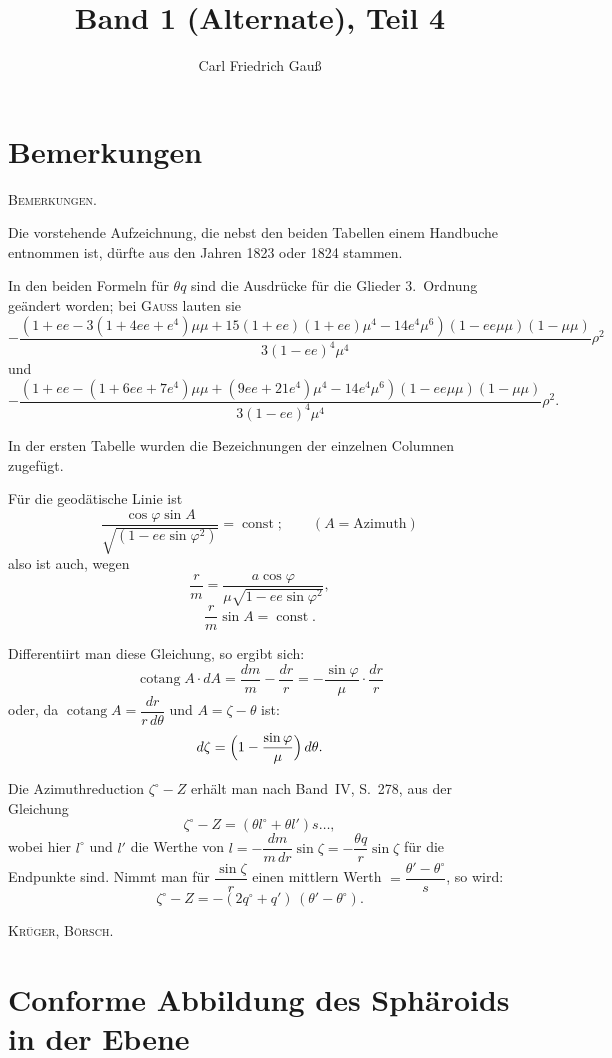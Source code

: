 \documentclass[12pt,a4paper]{article}
\title{Band 1 (Alternate), Teil 4}
\author{Carl Friedrich Gau\ss}
\date{}
\newcommand{\gaussname}{\textsc{Gau\ss}}
\newcommand{\cotang}{\operatorname{cotang}}
\DeclareMathOperator{\const}{const}
\begin{document}
\maketitle
\thispagestyle{empty}

\section*{Bemerkungen}

\begin{center}
\textsc{Bemerkungen.}
\end{center}

Die vorstehende Aufzeichnung, die nebst den beiden Tabellen einem Handbuche entnommen ist, dürfte aus den Jahren 1823 oder 1824 stammen.

In den beiden Formeln für $\theta q$ sind die Ausdrücke für die Glieder 3.~Ordnung geändert worden; bei \gaussname{} lauten sie
\[
-\frac{(1+ee-3(1+4ee+e^4)\mu\mu+15(1+ee)(1+ee)\mu^4-14e^4\mu^6)(1-ee\mu\mu)(1-\mu\mu)}{3(1-ee)^4\mu^4}\rho^2
\]
und
\[
-\frac{(1+ee-(1+6ee+7e^4)\mu\mu+(9ee+21e^4)\mu^4-14e^4\mu^6)(1-ee\mu\mu)(1-\mu\mu)}{3(1-ee)^4\mu^4}\rho^2.
\]

In der ersten Tabelle wurden die Bezeichnungen der einzelnen Columnen zugefügt.

Für die geodätische Linie ist
\[
\frac{\cos\varphi\sin A}{\sqrt{(1-ee\sin\varphi^2)}} = \const;\qquad (A = \text{Azimuth})
\]
also ist auch, wegen
\[
\frac{r}{m} = \frac{a\cos\varphi}{\mu\sqrt{1-ee\sin\varphi^2}},
\]
\[
\frac{r}{m}\sin A = \const.
\]

Differentiirt man diese Gleichung, so ergibt sich:
\[
\cotang A\cdot dA = \frac{dm}{m} - \frac{dr}{r} = -\frac{\sin\varphi}{\mu}\cdot\frac{dr}{r}
\]
oder, da $\cotang A = \dfrac{dr}{r\,d\theta}$ und $A = \zeta - \theta$ ist:
\[
d\zeta = \Bigl(1 - \frac{\sin\varphi}{\mu}\Bigr)\,d\theta.
\]

Die Azimuthreduction $\zeta^\circ - Z$ erhält man nach Band~IV, S.~278, aus der Gleichung
\[
\zeta^\circ - Z = (\theta l^\circ + \theta l')s\ldots,
\]
wobei hier $l^\circ$ und $l'$ die Werthe von $l = -\dfrac{dm}{m\,dr}\sin\zeta = -\dfrac{\theta q}{r}\sin\zeta$ für die Endpunkte sind. Nimmt man für $\dfrac{\sin\zeta}{r}$ einen mittlern Werth $= \dfrac{\theta'-\theta^\circ}{s}$, so wird:
\[
\zeta^\circ - Z = -(2q^\circ + q')\,(\theta'-\theta^\circ).
\]

\hfill\textsc{Krüger, Börsch.}

\newpage

\section*{Conforme Abbildung des Sphäroids in der Ebene}
\end{document}

